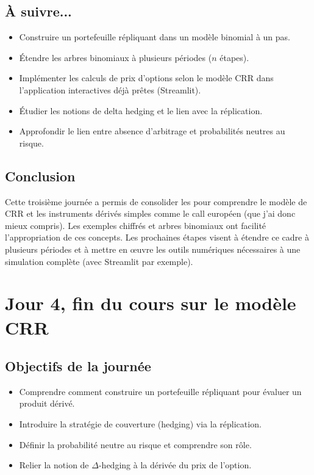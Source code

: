 \documentclass[a4paper,11pt]{article}
\begin{document}
\subsection{À suivre...}
\begin{itemize}
    \item Construire un portefeuille répliquant dans un modèle binomial à un pas.
    \item Étendre les arbres binomiaux à plusieurs périodes ($n$ étapes).
    \item Implémenter les calculs de prix d’options selon le modèle CRR dans l'application interactives déjà prêtes (Streamlit).
    \item Étudier les notions de delta hedging et le lien avec la réplication.
    \item Approfondir le lien entre absence d’arbitrage et probabilités neutres au risque.
\end{itemize}

\subsection{Conclusion}
Cette troisième journée a permis de consolider les pour comprendre le modèle de CRR et les instruments dérivés simples comme le call européen (que j'ai donc mieux compris). Les exemples chiffrés et arbres binomiaux ont facilité l’appropriation de ces concepts. Les prochaines étapes visent à étendre ce cadre à plusieurs périodes et à mettre en œuvre les outils numériques nécessaires à une simulation complète (avec Streamlit par exemple).

\newpage


\section{Jour 4, fin du cours sur le modèle CRR}

\subsection{Objectifs de la journée}
\begin{itemize}
    \item Comprendre comment construire un portefeuille répliquant pour évaluer un produit dérivé.
    \item Introduire la stratégie de couverture (hedging) via la réplication.
    \item Définir la probabilité neutre au risque et comprendre son rôle.
    \item Relier la notion de \(\Delta\)-hedging à la dérivée du prix de l’option.
\end{itemize}
\end{document}
